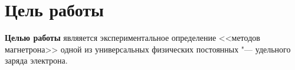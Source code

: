 \section{Цель работы}

\textbf{Целью работы} являяется экспериментальное определение <<методов магнетрона>> одной из универсальных физических постоянных "--- удельного заряда электрона.


